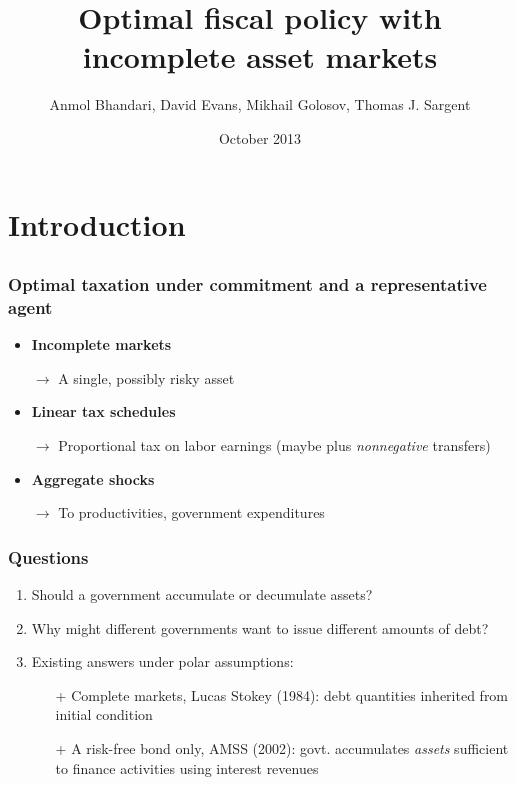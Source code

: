 \documentclass{beamer}
\title {Optimal fiscal policy with incomplete asset markets}
\author{Anmol Bhandari, David Evans, Mikhail Golosov, Thomas J. Sargent}
\date{October 2013}
\begin{document}
%
\begin{frame}
\titlepage

\end{frame}
\section{Introduction}
\subsection{}
\begin{frame}
\frametitle{Optimal taxation under commitment and a representative agent}

\begin{itemize}

 \item \textbf{Incomplete markets}

 \quad \color{red}$\rightarrow$ \color{black} A single, possibly risky asset

 \item \textbf{Linear tax schedules}

 \quad \color{red}$\rightarrow$ \color{black}Proportional tax on labor earnings (maybe plus  {\em nonnegative} transfers)

 \item \textbf{Aggregate shocks}

 \quad \color{red}$\rightarrow$ \color{black} To productivities, government expenditures

 \end{itemize}
\end{frame}



\begin{frame}
\frametitle{Questions}

\begin{enumerate}
\item Should a  government accumulate or decumulate assets?
\item Why might different governments want to issue different amounts of debt?
\item Existing answers under polar assumptions:  
\begin{itemize}
 \item [+] Complete markets, Lucas Stokey (1984): debt quantities inherited from initial condition
 \item [+ ] A risk-free bond only, AMSS (2002): govt. accumulates {\em assets} sufficient to finance activities using interest revenues
\end{itemize}

\end{enumerate}
\end{frame}
\end{document}
